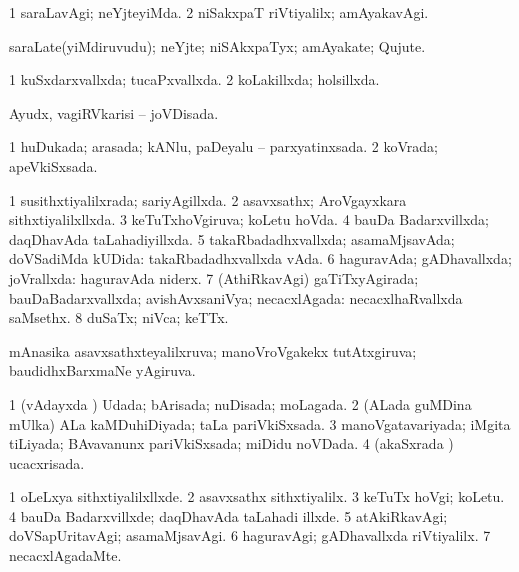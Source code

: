 {{\bentry
{} 
\gl{\kirxvi}
\expl{}
\bmng
\bnum
\num{1} saraLavAgi; neYjteyiMda. 
\num{2} niSakxpaT riVtiyalilx; amAyakavAgi. 
\enum
\emng
\eentry

\bentry
{} 
\gl{\nA}
\expl{}
\bmng
saraLate(yiMdiruvudu); neYjte; niSAkxpaTyx; amAyakate; Qujute. 
\emng
\eentry

\bentry
{} 
\gl{\nA}
\expl{}
\bmng
{} 
\emng
\eentry

\bentry
{} 
\gl{\gu}
\expl{}
\bmng
\bnum
\num{1} kuSxdarxvallxda; tucaPxvallxda. 
\num{2} koLakillxda; holsillxda. 
\enum
\emng
\eentry

\bentry
{} 
\gl{\gu}
\expl{}
\bmng
Ayudx, vagiRVkarisi -- joVDisada. 
\emng
\eentry

\bentry
{} 
\gl{\gu}
\expl{}
\bmng
\bnum
\num{1} huDukada; arasada; kANlu, paDeyalu -- parxyatinxsada. 
\num{2} koVrada; apeVkiSxsada. 
\enum
\emng
\eentry

\bentry
{} 
\gl{\gu}
\expl{}
\bmng
\bnum
\num{1} susithxtiyalilxrada; sariyAgillxda. 
\num{2} asavxsathx; AroVgayxkara sithxtiyalilxllxda. 
\num{3} keTuTxhoVgiruva; koLetu hoVda. 
\num{4} bauDa Badarxvillxda; daqDhavAda taLahadiyillxda. 
\num{5} takaRbadadhxvallxda; asamaMjsavAda; doVSadiMda kUDida:  takaRbadadhxvallxda vAda. 
\num{6} haguravAda; gADhavallxda; joVrallxda:  haguravAda niderx. 
\num{7} (AthiRkavAgi) gaTiTxyAgirada; bauDaBadarxvallxda; avishAvxsaniVya; necacxlAgada:  necacxlhaRvallxda saMsethx. 
\num{8} duSaTx; niVca; keTTx. 
\enum
\emng

\noindent
\gl{\pagu}
\expl{}
\bmng
{} mAnasika asavxsathxteyalilxruva; manoVroVgakekx tutAtxgiruva; baudidhxBarxmaNe yAgiruva. 
\emng
\eentry

\bentry
{} 
\gl{\gu}
\expl{}
\bmng
\bnum
\num{1} (vAdayxda \vi) Udada; bArisada; nuDisada; moLagada. 
\num{2} (ALada guMDina mUlka) ALa kaMDuhiDiyada; taLa pariVkiSxsada. 
\num{3} manoVgatavariyada; iMgita tiLiyada; BAvavanunx pariVkiSxsada; miDidu noVDada. 
\num{4} (akaSxrada \vi) ucacxrisada. 
\enum
\emng
\eentry

\bentry
{} 
\gl{\kirxvi}
\expl{}
\bmng
\bnum
\num{1} oLeLxya sithxtiyalilxllxde. 
\num{2} asavxsathx sithxtiyalilx. 
\num{3} keTuTx hoVgi; koLetu. 
\num{4} bauDa Badarxvillxde; daqDhavAda taLahadi illxde. 
\num{5} atAkiRkavAgi; doVSapUritavAgi; asamaMjsavAgi. 
\num{6} haguravAgi; gADhavallxda riVtiyalilx. 
\num{7} necacxlAgadaMte. 
\enum
\emng
\eentry

}}
